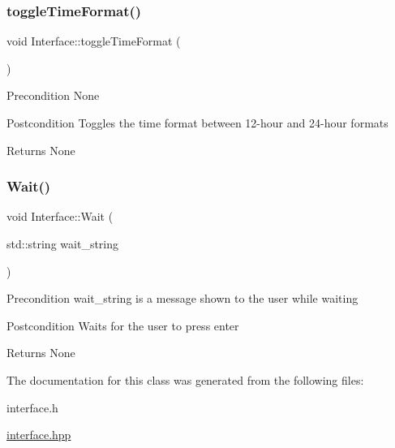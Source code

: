\subsubsection{\texorpdfstring{toggle\+Time\+Format()}{toggleTimeFormat()}}
{\footnotesize\ttfamily void Interface\+::toggle\+Time\+Format (\begin{DoxyParamCaption}{ }\end{DoxyParamCaption})\hspace{0.3cm}{\ttfamily [static]}}

\begin{DoxyPrecond}{Precondition}
None 
\end{DoxyPrecond}
\begin{DoxyPostcond}{Postcondition}
Toggles the time format between 12-\/hour and 24-\/hour formats 
\end{DoxyPostcond}
\begin{DoxyReturn}{Returns}
None 
\end{DoxyReturn}
\mbox{\label{classInterface_ab235ba2f0184e3fbfd5d5a64d5eb85ef}} 
\subsubsection{\texorpdfstring{Wait()}{Wait()}}
{\footnotesize\ttfamily void Interface\+::\+Wait (\begin{DoxyParamCaption}\item[{std\+::string}]{wait\+\_\+string }\end{DoxyParamCaption})\hspace{0.3cm}{\ttfamily [static]}}

\begin{DoxyPrecond}{Precondition}
wait\+\_\+string is a message shown to the user while waiting 
\end{DoxyPrecond}
\begin{DoxyPostcond}{Postcondition}
Waits for the user to press enter 
\end{DoxyPostcond}
\begin{DoxyReturn}{Returns}
None 
\end{DoxyReturn}


The documentation for this class was generated from the following files\+:\begin{DoxyCompactItemize}
\item 
interface.\+h\item 
\hyperlink{interface_8hpp}{interface.\+hpp}\end{DoxyCompactItemize}
